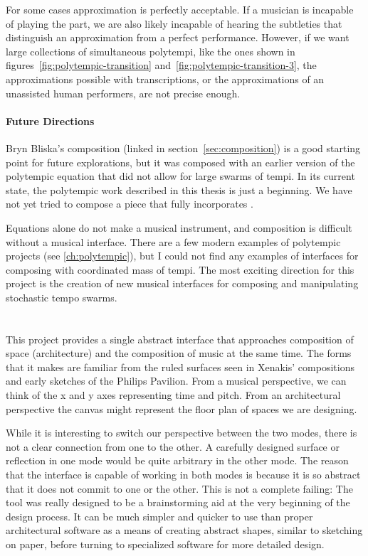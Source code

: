 For some cases approximation is perfectly acceptable. If a musician
is incapable of playing the part, we are also likely incapable of
hearing the subtleties that distinguish an approximation from a
perfect performance. However, if we want large collections of
simultaneous polytempi, like the ones shown in
figures~\ref{fig:polytempic-transition}
and~\ref{fig:polytempic-transition-3}, the approximations possible
with transcriptions, or the approximations of an unassisted human
performers, are not precise enough.

\paragraph{Future Directions} Bryn Bliska's composition (linked in
section~\ref{sec:composition}) is a good starting point for future
explorations, but it was composed with an earlier version of the
polytempic equation that did not allow for large swarms of tempi. In
its current state, the polytempic work described in this thesis is
just a beginning. We have not yet tried to compose a piece that
fully incorporates \polytempic. 

Equations alone do not make a musical instrument, and composition is
difficult without a musical interface. There are a few modern
examples of polytempic projects (see \autoref{ch:polytempic}), but I
could not find any examples of interfaces for composing with
coordinated mass of tempi. The most exciting direction for
this project is the creation of new musical interfaces for composing
and manipulating stochastic tempo swarms. 


\section{}
This project provides a single abstract interface that approaches
composition of space (architecture) and the composition of music at
the same time. The forms that it makes are familiar from the ruled
surfaces seen in Xenakis' compositions and early sketches of the
Philips Pavilion. From a musical perspective, we can think of the x
and y axes representing time and pitch. From an architectural
perspective the canvas might represent the floor plan of spaces we are
designing.

While it is interesting to switch our perspective between the two
modes, there is not a clear connection from one to the other. A
carefully designed surface or reflection in one mode would be quite
arbitrary in the other mode. The reason that the interface is capable
of working in both modes is because it is so abstract that it does
not commit to one or the other. This is not a complete failing: The
tool was really designed to be a brainstorming aid at the very
beginning of the design process. It can be much simpler and quicker to
use than proper architectural software as a means of creating
abstract shapes, similar to sketching on paper, before turning to
specialized software for more detailed design.


